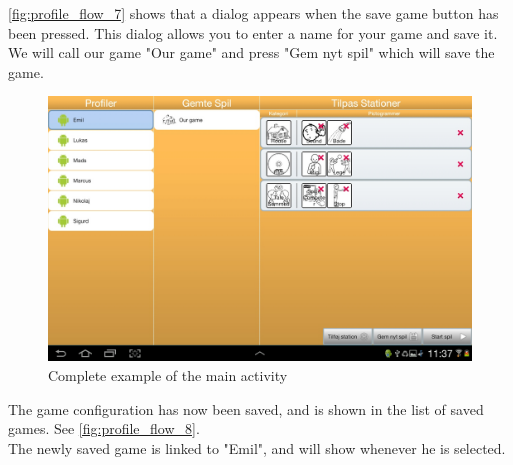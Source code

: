 \autoref{fig:profile_flow_7} shows that a dialog appears when the save game button has been pressed. This dialog allows you to enter a name for your game and save it. We will call our game "Our game" and press "Gem nyt spil" which will save the game.

\begin{figure}[H]
\centering
\includegraphics[width=0.9\linewidth]{img/screenshots/profile_flow_8.jpg}%
\caption{Complete example of the main activity}
\label{fig:profile_flow_8}
\end{figure}

The game configuration has now been saved, and is shown in the list of saved games. See \autoref{fig:profile_flow_8}.\\
The newly saved game is linked to "Emil", and will show whenever he is selected.
